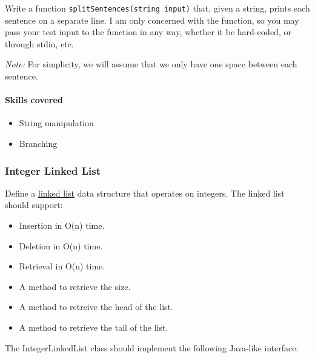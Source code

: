 Write a function \lstinline!splitSentences(string input)! that, given a
string, prints each sentence on a separate line. I am only concerned
with the function, so you may pass your test input to the function in
any way, whether it be hard-coded, or through stdin, etc.

\emph{Note:} For simplicity, we will assume that we only have one space
between each sentence.

\paragraph{Skills covered}\label{skills-covered}

\begin{itemize}
\itemsep1pt\parskip0pt
\item
  String manipulation
\item
  Branching
\end{itemize}

\subsubsection{Integer Linked List}\label{integer-linked-list}

Define a
\href{http://en.wikipedia.org/wiki/Linked_list\#Singly_linked_list}{linked
list} data structure that operates on integers. The linked list should
support:

\begin{itemize}
\itemsep1pt\parskip0pt
\item
  Insertion in O(n) time.
\item
  Deletion in O(n) time.
\item
  Retrieval in O(n) time.
\item
  A method to retrieve the size.
\item
  A method to retreive the head of the list.
\item
  A method to retrieve the tail of the list.
\end{itemize}

The IntegerLinkedList class should implement the following Java-like
interface:


